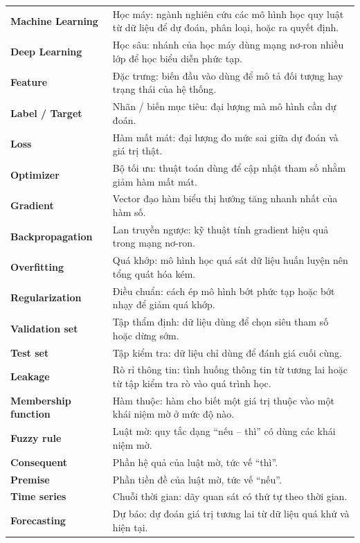 \begin{longtable}{p{}p{}}
\textbf{Machine Learning} & Học máy: ngành nghiên cứu các mô hình học quy luật từ dữ liệu để dự đoán, phân loại, hoặc ra quyết định.\\
\textbf{Deep Learning} & Học sâu: nhánh của học máy dùng mạng nơ-ron nhiều lớp để học biểu diễn phức tạp.\\
\textbf{Feature} & Đặc trưng: biến đầu vào dùng để mô tả đối tượng hay trạng thái của hệ thống.\\
\textbf{Label / Target} & Nhãn / biến mục tiêu: đại lượng mà mô hình cần dự đoán.\\
\textbf{Loss} & Hàm mất mát: đại lượng đo mức sai giữa dự đoán và giá trị thật.\\
\textbf{Optimizer} & Bộ tối ưu: thuật toán dùng để cập nhật tham số nhằm giảm hàm mất mát.\\
\textbf{Gradient} & Vector đạo hàm biểu thị hướng tăng nhanh nhất của hàm số.\\
\textbf{Backpropagation} & Lan truyền ngược: kỹ thuật tính gradient hiệu quả trong mạng nơ-ron.\\
\textbf{Overfitting} & Quá khớp: mô hình học quá sát dữ liệu huấn luyện nên tổng quát hóa kém.\\
\textbf{Regularization} & Điều chuẩn: cách ép mô hình bớt phức tạp hoặc bớt nhạy để giảm quá khớp.\\
\textbf{Validation set} & Tập thẩm định: dữ liệu dùng để chọn siêu tham số hoặc dừng sớm.\\
\textbf{Test set} & Tập kiểm tra: dữ liệu chỉ dùng để đánh giá cuối cùng.\\
\textbf{Leakage} & Rò rỉ thông tin: tình huống thông tin từ tương lai hoặc từ tập kiểm tra rò vào quá trình học.\\
\textbf{Membership function} & Hàm thuộc: hàm cho biết một giá trị thuộc vào một khái niệm mờ ở mức độ nào.\\
\textbf{Fuzzy rule} & Luật mờ: quy tắc dạng ``nếu -- thì'' có dùng các khái niệm mờ.\\
\textbf{Consequent} & Phần hệ quả của luật mờ, tức vế ``thì''.\\
\textbf{Premise} & Phần tiền đề của luật mờ, tức vế ``nếu''.\\
\textbf{Time series} & Chuỗi thời gian: dãy quan sát có thứ tự theo thời gian.\\
\textbf{Forecasting} & Dự báo: dự đoán giá trị tương lai từ dữ liệu quá khứ và hiện tại.\\
\end{longtable}

